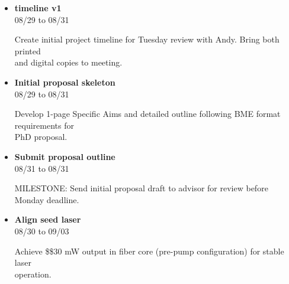 \documentclass[landscape,a4paper]{article}
\begin{document}
\begin{itemize}[leftmargin=1cm, itemsep=0.8em]
    \item \textcolor{researchcore}{\textbf{timeline v1}}\\[0.2em]
          \textcolor{black!70}{\small 08/29 to 08/31}
\\[0.3em]
          \begin{minipage}[t]{0.85\textwidth}
          \textcolor{black!80}{Create initial project timeline for Tuesday review with Andy. Bring both printed\\[0.1em]
          and digital copies to meeting.}
          \end{minipage}

    \item \textcolor{researchcore}{\textbf{Initial proposal skeleton}}\\[0.2em]
          \textcolor{black!70}{\small 08/29 to 08/31}
\\[0.3em]
          \begin{minipage}[t]{0.85\textwidth}
          \textcolor{black!80}{Develop 1-page Specific Aims and detailed outline following BME format requirements for\\[0.1em]
          PhD proposal.}
          \end{minipage}

    \item \textcolor{researchcore}{\textbf{Submit proposal outline}}\\[0.2em]
          \textcolor{black!70}{\small 08/31 to 08/31}
\\[0.3em]
          \begin{minipage}[t]{0.85\textwidth}
          \textcolor{black!80}{MILESTONE: Send initial proposal draft to advisor for review before Monday deadline.}
          \end{minipage}

    \item \textcolor{researchexp}{\textbf{Align seed laser}}\\[0.2em]
          \textcolor{black!70}{\small 08/30 to 09/03}
\\[0.3em]
          \begin{minipage}[t]{0.85\textwidth}
          \textcolor{black!80}{Achieve \$\geq\$30 mW output in fiber core (pre-pump configuration) for stable laser\\[0.1em]
          operation.}
          \end{minipage}

\end{itemize}
\end{document}
